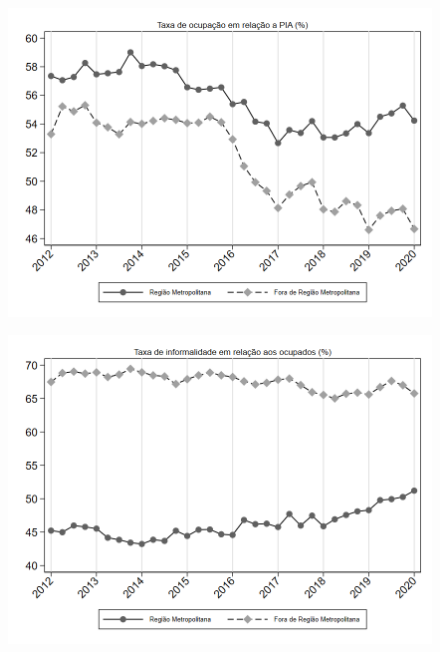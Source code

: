 \begin{frame}[label=_composicao_demografica_regiao_metro_taxa_de_ocupacao]{}
\textit{\hyperlink{_composicao_demografica_regiao_metro}{}}
\begin{figure}
  \centering
  \includegraphics[width=1\linewidth]{../../analysis/output/composicao_demografica/area_geografica/_composicao_demografica_regiao_metro_taxa_de_ocupacao.png}
  \caption{}
  \label{fig:_composicao_demografica_regiao_metro_taxa_de_ocupacao}
\end{figure}
\end{frame}

\begin{frame}[label=_composicao_demografica_regiao_metro_taxa_de_informalidade]{}
\textit{\hyperlink{_composicao_demografica_regiao_metro}{}}
\begin{figure}
  \centering
  \includegraphics[width=1.0\linewidth]{../../analysis/output/composicao_demografica/area_geografica/_composicao_demografica_regiao_metro_taxa_de_informalidade.png}
  \caption{}
  \label{fig:_composicao_demografica_regiao_metro_taxa_de_informalidade}
\end{figure}
\end{frame}

